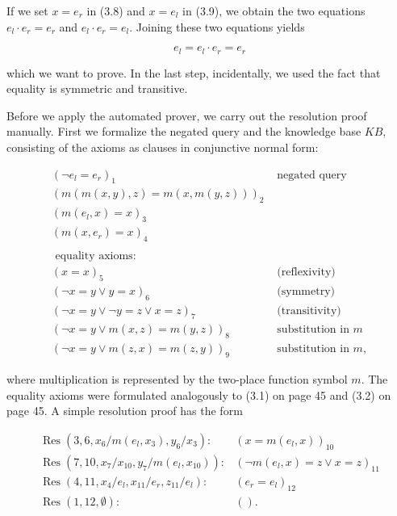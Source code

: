 \documentclass[10pt]{article}
\begin{document}
If we set $x=e_{r}$ in (3.8) and $x=e_{l}$ in (3.9), we obtain the two equations $e_{l} \cdot e_{r}=e_{r}$ and $e_{l} \cdot e_{r}=e_{l}$. Joining these two equations yields

$$
e_{l}=e_{l} \cdot e_{r}=e_{r}
$$

which we want to prove. In the last step, incidentally, we used the fact that equality is symmetric and transitive.

Before we apply the automated prover, we carry out the resolution proof manually. First we formalize the negated query and the knowledge base $K B$, consisting of the axioms as clauses in conjunctive normal form:

$$
\begin{array}{ll}
\left(\neg e_{l}=e_{r}\right)_{1} & \text { negated query } \\
(m(m(x, y), z)=m(x, m(y, z)))_{2} & \\
\left(m\left(e_{l}, x\right)=x\right)_{3} & \\
\left(m\left(x, e_{r}\right)=x\right)_{4} & \\
& \\
\text { equality axioms: } & \\
(x=x)_{5} & \text { (reflexivity) } \\
(\neg x=y \vee y=x)_{6} & \text { (symmetry) } \\
(\neg x=y \vee \neg y=z \vee x=z)_{7} & \text { (transitivity) } \\
(\neg x=y \vee m(x, z)=m(y, z))_{8} & \text { substitution in } m \\
(\neg x=y \vee m(z, x)=m(z, y))_{9} & \text { substitution in } m,
\end{array}
$$

where multiplication is represented by the two-place function symbol $m$. The equality axioms were formulated analogously to (3.1) on page 45 and (3.2) on page 45. A simple resolution proof has the form

$$
\begin{array}{ll}
\operatorname{Res}\left(3,6, x_{6} / m\left(e_{l}, x_{3}\right), y_{6} / x_{3}\right): & \left(x=m\left(e_{l}, x\right)\right)_{10} \\
\operatorname{Res}\left(7,10, x_{7} / x_{10}, y_{7} / m\left(e_{l}, x_{10}\right)\right): & \left(\neg m\left(e_{l}, x\right)=z \vee x=z\right)_{11} \\
\operatorname{Res}\left(4,11, x_{4} / e_{l}, x_{11} / e_{r}, z_{11} / e_{l}\right): & \left(e_{r}=e_{l}\right)_{12} \\
\operatorname{Res}(1,12, \emptyset): & () .
\end{array}
$$
\end{document}
